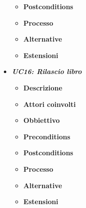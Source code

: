 \begin{itemize}
\begin{itemize}
		\item \textbf{Postconditions}
		\item \textbf{Processo}
		\item \textbf{Alternative}
		\item \textbf{Estensioni}
	\end{itemize}
	\item \textbf{\textit{UC16: Rilascio libro}}
	\begin{itemize}
		\item \textbf{Descrizione}
		\item \textbf{Attori coinvolti}
		\item \textbf{Obbiettivo}
		\item \textbf{Preconditions}
		\item \textbf{Postconditions}
		\item \textbf{Processo}
		\item \textbf{Alternative}
		\item \textbf{Estensioni}
	\end{itemize}
\end{itemize}